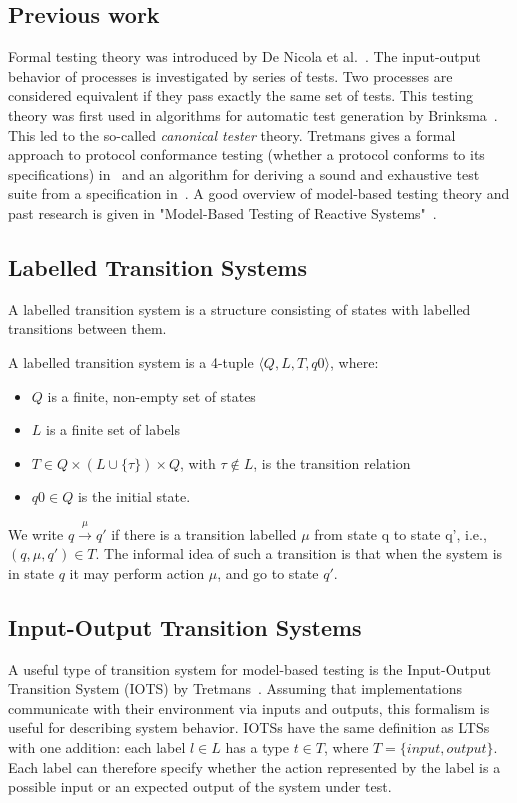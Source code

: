 \subsection{Previous work}
Formal testing theory was introduced by De Nicola et al.~\cite{denicola:testing}. The input-output behavior of processes is investigated by series of tests. Two processes are considered equivalent if they pass exactly the same set of tests. This testing theory was first used in algorithms for automatic test generation by Brinksma~\cite{brinksma:testgeneration}. This led to the so-called \textit{canonical tester} theory. Tretmans gives a formal approach to protocol conformance testing (whether a protocol conforms to its specifications) in~\cite{Tretmans:conformancetesting} and an algorithm for deriving a sound and exhaustive test suite from a specification in~\cite{Tretmans:testgeneration}. A good overview of model-based testing theory and past research is given in "Model-Based Testing of Reactive Systems"~\cite{Broy:ModelBasedTesting}.

\subsection{Labelled Transition Systems}
A labelled transition system is a structure consisting of states with labelled transitions between them.
\vspace{5px}
\begin{definition}
A labelled transition system is a 4-tuple	$\langle Q, L, T, q0\rangle$, where:
\begin{itemize}
\item $Q$ is a finite, non-empty set of states
\item $L$ is a finite set of labels
\item $T \in Q \times (L \cup \{\tau\}) \times Q$, with $\tau \notin L$, is the transition relation
\item $q0 \in Q$ is the initial state.
\end{itemize}
We write $q \xrightarrow{\mu}q'$ if there is a transition labelled $\mu$ from state q to state q', i.e., $(q, \mu, q') \in T$. The informal idea of such a transition is that when the system is in state $q$ it may perform action $\mu$, and go to state $q'$. 
\end{definition}

\subsection{Input-Output Transition Systems}
A useful type of transition system for model-based testing is the Input-Output Transition System (IOTS) by Tretmans~\cite{Tretmans:testgeneration}. Assuming that implementations communicate with their environment via inputs and outputs, this formalism is useful for describing system behavior. IOTSs have the same definition as LTSs with one addition: each label $l \in L$ has a type $t \in T$, where $T = \{input, output\}$. Each label can therefore specify whether the action represented by the label is a possible input or an expected output of the system under test.

